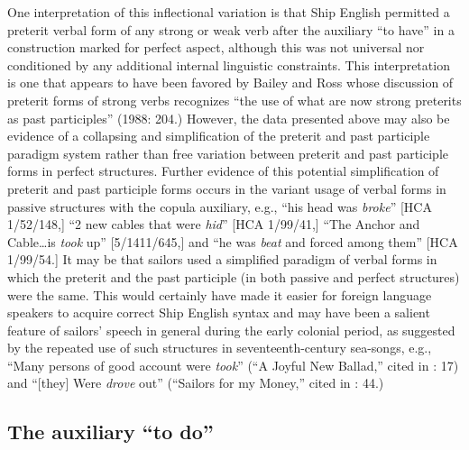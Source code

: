 One interpretation of this inflectional variation is that Ship English permitted a preterit verbal form of any strong or weak verb after the auxiliary “to have” in a construction marked for perfect aspect, although this was not universal nor conditioned by any additional internal linguistic constraints. This interpretation is one that appears to have been favored by Bailey and Ross whose discussion of preterit forms of strong verbs recognizes “the use of what are now strong preterits as past participles” (1988: 204.) However, the data presented above may also be evidence of a collapsing and simplification of the preterit and past participle paradigm system rather than free variation between preterit and past participle forms in perfect structures. Further evidence of this potential simplification of preterit and past participle forms occurs in the variant usage of verbal forms in passive structures with the copula auxiliary, e.g., “his head was \textit{broke}” [HCA 1/52/148,] “2 new cables that were \textit{hid}” [HCA 1/99/41,] “The Anchor and Cable…is \textit{took} up” [5/1411/645,] and “he was \textit{beat} and forced among them” [HCA 1/99/54.] It may be that sailors used a simplified paradigm of verbal forms in which the preterit and the past participle (in both passive and perfect structures) were the same. This would certainly have made it easier for foreign language speakers to acquire correct Ship English syntax and may have been a salient feature of sailors’ speech in general during the early colonial period, as suggested by the repeated use of such structures in seventeenth-century sea-songs, e.g., “Many persons of good account were \textit{took}” (“A Joyful New Ballad,” cited in \citealt{Palmer1986}: 17) and “[they] Were \textit{drove} out” (“Sailors for my Money,” cited in \citealt{Palmer1986}: 44.) 

\subsection{{The} {auxiliary} {“to} {do”}}%

